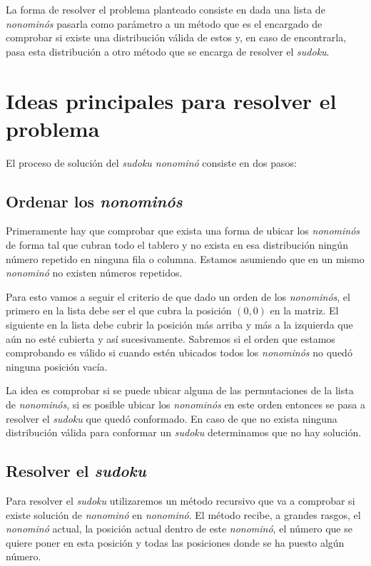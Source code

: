 \documentclass[12pt]{article}
\begin{document}
La forma de resolver el problema planteado consiste en dada una lista de \emph{nonomin\'os} pasarla como par\'ametro a un m\'etodo que es el encargado de comprobar si existe una distribuci\'on v\'alida de estos y, en caso de encontrarla, pasa esta distribuci\'on a otro m\'etodo que se encarga de resolver el \emph{sudoku}.


\section{Ideas principales para resolver el problema}
El proceso de soluci\'on del \emph{sudoku nonomin\'o} consiste en dos pasos:

\subsection{Ordenar los \emph{nonomin\'os}}
Primeramente hay que comprobar que exista una forma de ubicar los \emph{nonomin\'os} de forma tal que cubran todo el tablero y no exista en esa distribuci\'on ning\'un n\'umero repetido en ninguna fila o columna. Estamos asumiendo que en un mismo \emph{nonomin\'o} no existen n\'umeros repetidos.

Para esto vamos a seguir el criterio de que dado un orden de los \emph{nonomin\'os}, el primero en la lista debe ser el que cubra la posici\'on $(0, 0)$ en la matriz. El siguiente en la lista debe cubrir la posici\'on m\'as arriba y m\'as a la izquierda que a\'un no est\'e cubierta y as\'i sucesivamente. Sabremos si el orden que estamos comprobando es v\'alido si cuando est\'en ubicados todos los \emph{nonomin\'os} no qued\'o ninguna posici\'on vac\'ia.

La idea es comprobar si se puede ubicar alguna de las permutaciones de la lista de \emph{nonomin\'os}, si es posible ubicar los \emph{nonomin\'os} en este orden entonces se pasa a resolver el \emph{sudoku} que qued\'o conformado. En caso de que no exista ninguna distribuci\'on v\'alida para conformar un \emph{sudoku} determinamos que no hay soluci\'on. 

\subsection{Resolver el \emph{sudoku}}
Para resolver el \emph{sudoku} utilizaremos un m\'etodo recursivo que va a comprobar si existe soluci\'on de \emph{nonomin\'o} en \emph{nonomin\'o}. El m\'etodo recibe, a grandes rasgos, el \emph{nonomin\'o} actual, la posici\'on actual dentro de este \emph{nonomin\'o}, el n\'umero que se quiere poner en esta posici\'on y todas las posiciones donde se ha puesto alg\'un n\'umero.
\end{document}
